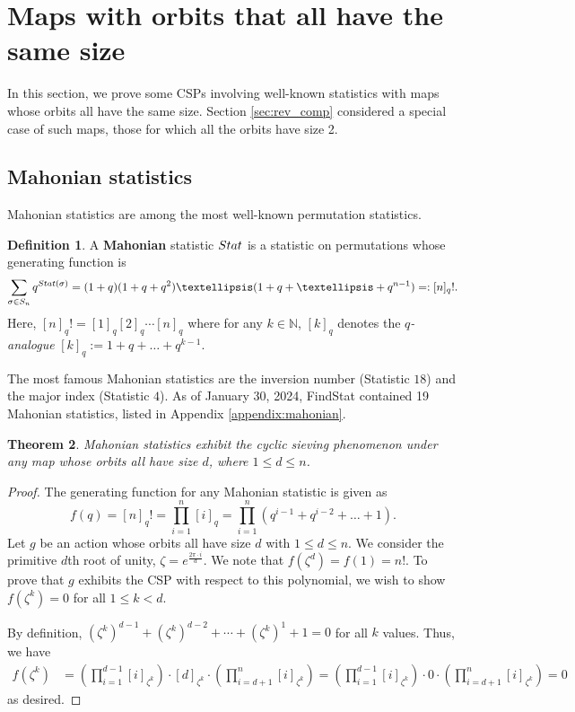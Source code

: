 \documentclass{amsart}
\newtheorem{thm}{Theorem}[section]
\theoremstyle{definition}
\newtheorem{definition}[thm]{Definition}
\newcommand{\Stat}{\textnormal{Stat}}
\begin{document}
 
\section{Maps with orbits that all have the same size}
\label{sec:basic}

In this section, we prove some CSPs involving  well-known statistics with maps whose orbits all have the same size. Section \ref{sec:rev_comp} considered a special case of such maps, those for which all the orbits have size 2.
\subsection{Mahonian statistics}
Mahonian statistics are among the most well-known permutation statistics.

\begin{definition}
  A \textbf{Mahonian} statistic $\Stat$ is a statistic on permutations whose generating function is
  \[ \sum_{\sigma \in S_n} q^{\Stat(\sigma)} = (1+q)(1+q+q^2)\ldots(1+q+\ldots+q^{n-1}) =: [n]_q!.\]
  Here, $[n]_q!=[1]_q[2]_q\cdots[n]_q$ where for any $k\in\mathbb{N}$, $[k]_q$ denotes the \emph{$q$-analogue} $[k]_q:=1+q+\ldots+q^{k-1}$.
\end{definition}
The most famous Mahonian statistics are the inversion number (Statistic $18$) and the major index (Statistic $4$). As of January 30, 2024, FindStat contained 19 Mahonian statistics, listed in Appendix \ref{appendix:mahonian}.




\begin{thm}\label{Mahonian}
  Mahonian statistics exhibit the cyclic sieving phenomenon under any  map whose orbits all have size $d$, where $1 \leq d\leq n$.
\end{thm}

\begin{proof}
  The generating function for any Mahonian statistic is given as
  \[
    f(q) = [n]_q! = \prod_{i=1}^n [i]_q =  \prod_{i=1}^n (q^{i-1}+q^{i-2} +\ldots +1).
  \]
  Let $g$ be an action whose orbits all have size $d$ with $1\leq d\leq n$. We consider the primitive $d$th root of unity, $\zeta = e^{\frac{2\pi \cdot i}{d}}$.  We note that $f(\zeta^d)=f(1)=n!$.
  To prove that $g$ exhibits the CSP with respect to this polynomial, we wish to show $f(\zeta^k)=0$ for all $1\leq k< d$.

  By definition, $(\zeta^k)^{d-1}+(\zeta^k)^{d-2} +\cdots + (\zeta^k)^{1} +1=0$ for all $k$ values. Thus, we have
  \begin{align*}
    f(\zeta^k) & =\left (\prod_{i=1}^{d-1}[i]_{\zeta^k} \right) \cdot [d]_{\zeta^k} \cdot \left (\prod_{i=d+1}^{n}[i]_{\zeta^k} \right ) = \left (\prod_{i=1}^{d-1}[i]_{\zeta^k} \right) \cdot 0 \cdot \left( \prod_{i=d+1}^{n}[i]_{\zeta^k} \right)  = 0
  \end{align*}
  as desired.
\end{proof}
\end{document}
